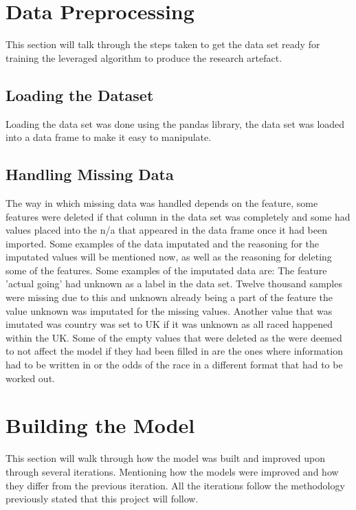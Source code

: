 \section{Data Preprocessing}
This section will talk through the steps taken to get the data set ready for training the leveraged algorithm to produce the research artefact.

\subsection{Loading the Dataset}
Loading the data set was done using the pandas library, the data set was loaded into a data frame to make it easy to manipulate. 

\subsection{Handling Missing Data}
The way in which missing data was handled depends on the feature, some features were deleted if that column in the data set was completely and some had values placed into the n/a that appeared in the data frame once it had been imported. Some examples of the data imputated and the reasoning for the imputated values will be mentioned now, as well as the reasoning for deleting some of the features. Some examples of the imputated data are: The feature 'actual going' had unknown as a label in the data set. Twelve thousand samples were missing due to this and unknown already being a part of the feature the value unknown was imputated for the missing values. Another value that was imutated was country was set to UK if it was unknown as all raced happened within the UK. Some of the empty values that were deleted as the were deemed to not affect the model if they had been filled in are the ones where information had to be written in or the odds of the race in a different format that had to be worked out. 

\section{Building the Model}
This section will walk through how the model was built and improved upon through several iterations. Mentioning how the models were improved and how they differ from the previous iteration. All the iterations follow the methodology previously stated that this project will follow. 

